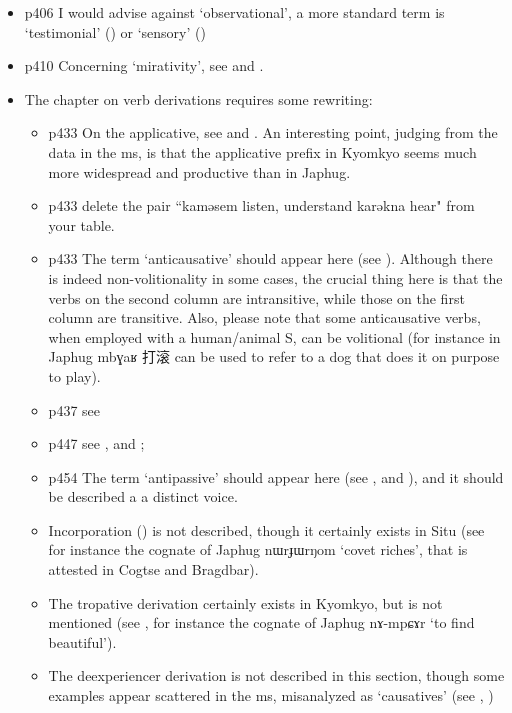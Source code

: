 \documentclass[oldfontcommands,oneside,a4paper,11pt]{article}
\newcommand{\ipa}[1]{{\phon \mbox{#1}}} %
\newcommand{\zh}[1]{{\cn #1}}
\begin{document}
\begin{itemize}
\item p406 I would advise against `observational', a more standard term is `testimonial' (\citealt{hill13hdug}) or `sensory' (\citealt{tournadre14evidentiality})
\item p410 Concerning `mirativity', see \citet{hill13hdug} and \citealt{tournadre14evidentiality}.
\item The chapter on verb derivations requires some rewriting:
\begin{itemize}
\item p433 On the applicative, see \citet{jacques13tropative} and \citet{jackson14morpho}. An interesting point, judging from the data in the ms, is that the applicative prefix in Kyomkyo seems much more widespread and productive than in Japhug. 
\item p433 delete the pair ``\ipa{kaməsem} listen, understand \ipa{karəkna} hear" from your table.
\item  p433 The term `anticausative' should appear here (see \citealt{jacques12demotion}). Although there is indeed non-volitionality in some cases, the crucial thing here is that the verbs on the second column are intransitive, while those on the first column are transitive. Also, please note that some anticausative verbs, when employed with a human/animal S, can be volitional (for instance in Japhug \ipa{mbɣaʁ} \zh{打滚}  can be used to refer to a dog that does it on purpose to play).
\item p437 see \citet{jacques10refl}
\item p447 see \citet{jacques07passif}, \citet{jacques12demotion} and \citet{jackson14morpho}; 
\item p454 The  term `antipassive' should appear here (see \citealt{jacques12demotion}, \citet{jacques14antipassive} and \citet{jackson14morpho}), and it should be described a a distinct voice.
\item Incorporation (\citealt{jacques12incorp}) is not described, though it certainly exists in Situ (see for instance the cognate of Japhug \ipa{nɯrɟɯrŋom} `covet riches', that is attested in Cogtse and Bragdbar). 
\item The tropative derivation certainly exists in Kyomkyo, but is not mentioned (see \citealt{jacques13tropative}, for instance the cognate of Japhug \ipa{nɤ-mpɕɤr} `to find beautiful').
\item The deexperiencer derivation is not described in this section, though some examples appear scattered in the ms, misanalyzed as `causatives' (see \citealt{jacques12demotion}, \citet{jackson14morpho})

\end{itemize}
\end{itemize}
\end{document}
